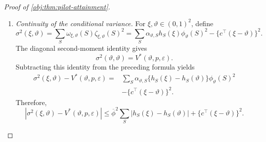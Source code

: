 \begin{proof}[Proof of \cref{obj:thm:pilot-attainment}]
\begin{enumerate}
For \(\xi,\vartheta\in(0,1)^2\), define the main-release probabilities and centered correction by
\[
\omega_{\xi,\vartheta}(S)
=\alpha_{\vartheta,S}h_S(\xi),
\qquad
\zeta_{\xi,\vartheta}(S)
=\phi_\vartheta(S)-c^\top(\xi-\vartheta).
\]
These probabilities are nonnegative and sum to one. Expanding the affine denominator gives
\[
\begin{aligned}
\sum_S\omega_{\xi,\vartheta}(S)\phi_\vartheta(S)
&=\frac1{J_\vartheta}
\left\{
\sum_S\alpha_{\vartheta,S}g_S^\top v(t_\vartheta)
+(\xi-\vartheta)^\top
 I_\vartheta(\alpha_\vartheta)v(t_\vartheta)
\right\}\\
&=c^\top(\xi-\vartheta).
\end{aligned}
\]
At the diagonal,
\[
\sum_S\omega_{\vartheta,\vartheta}(S)\phi_\vartheta(S)^2
=\frac{F_\vartheta(\alpha_\vartheta,t_\vartheta)}{J_\vartheta^2}
=\frac1{J_\vartheta}
=V^*(\vartheta,p,\varepsilon).
\]
In particular,
\[
\sum_S\omega_{\xi,\vartheta}(S)\zeta_{\xi,\vartheta}(S)=0,
\qquad
|\zeta_{\xi,\vartheta}(S)|\le2\overline\phi.
\]
For the last inequality, the exact mean identity and the probability normalization imply
\[
|c^\top(\xi-\vartheta)|
=\left|\sum_S\omega_{\xi,\vartheta}(S)\phi_\vartheta(S)\right|
\le\overline\phi.
\]

\item \emph{Continuity of the conditional variance.}
For \(\xi,\vartheta\in(0,1)^2\), define
\[
\sigma^2(\xi,\vartheta)
=\sum_S\omega_{\xi,\vartheta}(S)\zeta_{\xi,\vartheta}(S)^2
=\sum_S\alpha_{\vartheta,S}h_S(\xi)\phi_\vartheta(S)^2
-\{c^\top(\xi-\vartheta)\}^2.
\]
The diagonal second-moment identity gives
\[
\sigma^2(\vartheta,\vartheta)=V^*(\vartheta,p,\varepsilon).
\]
Subtracting this identity from the preceding formula yields
\[
\begin{aligned}
\sigma^2(\xi,\vartheta)-V^*(\vartheta,p,\varepsilon)
={}&\sum_S\alpha_{\vartheta,S}
\{h_S(\xi)-h_S(\vartheta)\}\phi_\vartheta(S)^2\\
&-\{c^\top(\xi-\vartheta)\}^2.
\end{aligned}
\]
Therefore,
\[
\left|\sigma^2(\xi,\vartheta)-V^*(\vartheta,p,\varepsilon)\right|
\le
\overline\phi^2\sum_S|h_S(\xi)-h_S(\vartheta)|
+\{c^\top(\xi-\vartheta)\}^2.
\]


\end{enumerate}
\end{proof}
